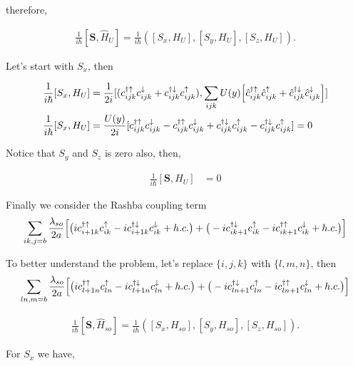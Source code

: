 \documentclass[10pt,prb,showpacs,amssymb,floatfix]{revtex4-1}
\newcommand{\dg}{\dagger}
\newcommand{\dna}{\downarrow}
\newcommand{\nn}{\nonumber}
\newcommand{\upa}{\uparrow}
\newcommand{\h}{\hat}
\begin{document}
therefore,

\begin{align}
\frac{1}{i\hbar}[\bm S, \h H_U] =  \frac{1}{i\hbar}([S_x, H_{U}], 
    [S_y, H_{U}],  
    [S_z, H_{U}] ).
\end{align}

Let's start with $S_x$, then

\begin{align}
\frac{1}{i\hbar}[S_x, H_U] &= \frac{1}{2i}[ (c_{ijk}^{\dg\upa} c_{ijk}^{\dna} + c_{ijk}^{\dg\dna} c_{ijk}^{\upa}), \sum_{ijk} U(y) \Big{[}  \hat{c}_{ijk}^{\dagger \upa} \hat{c}^{\upa}_{ijk} +   \hat{c}_{ijk}^{\dagger \dna} \hat{c}^{\dna}_{ijk} \Big{]}] \nn\\
\frac{1}{i\hbar}[S_x, H_U]  &= \frac{U(y)}{2i} [  c_{ijk}^{\dg\upa} c_{ijk}^{\dna}   - c_{ijk}^{\dg\upa} c_{ijk}^{\dna}  +  c_{ijk}^{\dg\dna} c_{ijk}^{\upa} -  c_{ijk}^{\dg\dna} c_{ijk}^{\upa} ] = 0
\end{align}

Notice that $S_y$ and $S_z$ is zero also, then,

\begin{align}
\frac{1}{i\hbar}[\bm S, H_U] &= 0 
\end{align}

Finally we consider the Rashba coupling term
\begin{align}
\sum_{ik, j=b} \frac{\lambda_{so}}{2a} \Big{[} \big{(}i c_{i+1k}^{\dagger \uparrow} c_{ik}^\uparrow  - i c_{i+1k}^{\dagger \downarrow} c_{ik}^\downarrow + h.c. \big{)} +  \big{(} -i c_{ik+1}^{\dagger \downarrow}  c_{ik}^\uparrow  - i c_{ik+1}^{\dagger \uparrow}  c_{ik}^\downarrow + h.c. \big{)}  \Big{]}
\end{align}

To better understand the problem, let's replace $\{i,j,k\}$ with $\{l,m,n\}$, then
\begin{align}
\sum_{ln, m=b} \frac{\lambda_{so}}{2a} \Big{[} \big{(}i c_{l+1n}^{\dagger \uparrow} c_{l n}^\uparrow  - i c_{l+1n}^{\dagger \downarrow} c_{ln}^\downarrow + h.c. \big{)} +  \big{(} -i c_{l n+1}^{\dagger \downarrow}  c_{l n}^\uparrow  - i c_{ln+1}^{\dagger \uparrow}  c_{ln}^\downarrow + h.c. \big{)}  \Big{]}
\end{align}

\begin{align}
\frac{1}{i\hbar}[\bm S, \h H_{so}] =  \frac{1}{i\hbar}([S_x, H_{so}], 
    [S_y, H_{so}],  
    [S_z, H_{so}] ).
\end{align}

For $S_x$ we have,
\end{document}
